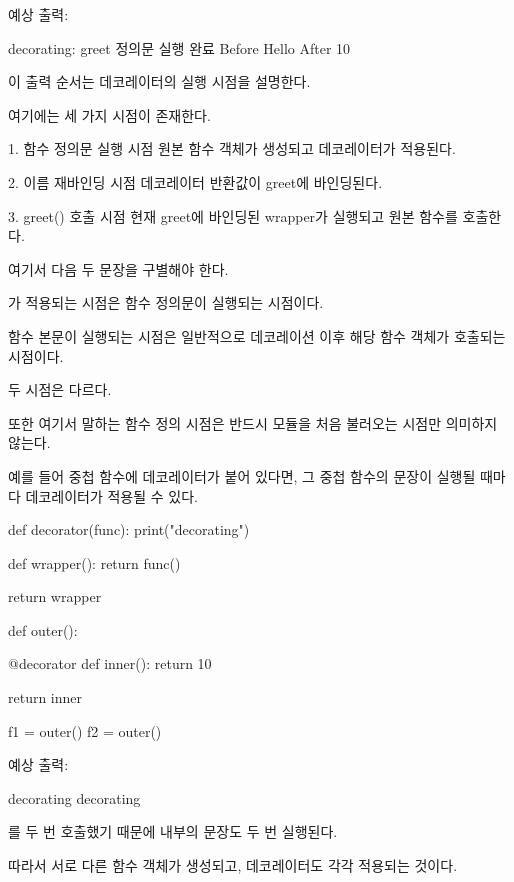 예상 출력:

\begin{dhkzsh}
decorating: greet
정의문 실행 완료
Before
Hello
After
10
\end{dhkzsh}

이 출력 순서는 데코레이터의 실행 시점을 설명한다.

여기에는 세 가지 시점이 존재한다.

\begin{dhksmry}
    1. 함수 정의문 실행 시점
       원본 함수 객체가 생성되고 데코레이터가 적용된다.

    2. 이름 재바인딩 시점
       데코레이터 반환값이 greet에 바인딩된다.

    3. greet() 호출 시점
       현재 greet에 바인딩된 wrapper가 실행되고 원본 함수를 호출한다.
\end{dhksmry}

여기서 다음 두 문장을 구별해야 한다.

가 적용되는 시점은 함수 정의문이 실행되는 시점이다.

 함수 본문이 실행되는 시점은 일반적으로 데코레이션 이후 해당 함수 객체가 호출되는 시점이다.

두 시점은 다르다.

또한 여기서 말하는 함수 정의 시점은 반드시 모듈을 처음 불러오는 시점만 의미하지 않는다.

예를 들어 중첩 함수에 데코레이터가 붙어 있다면, 그 중첩 함수의  문장이 실행될 때마다 데코레이터가 적용될 수 있다.

\begin{dhkcode}
def decorator(func):
    print("decorating")

    def wrapper():
        return func()

    return wrapper


def outer():

    @decorator
    def inner():
        return 10

    return inner


f1 = outer()
f2 = outer()
\end{dhkcode}

예상 출력:

\begin{dhkzsh}
decorating
decorating
\end{dhkzsh}

를 두 번 호출했기 때문에 내부의  문장도 두 번 실행된다.

따라서 서로 다른  함수 객체가 생성되고, 데코레이터도 각각 적용되는 것이다.

